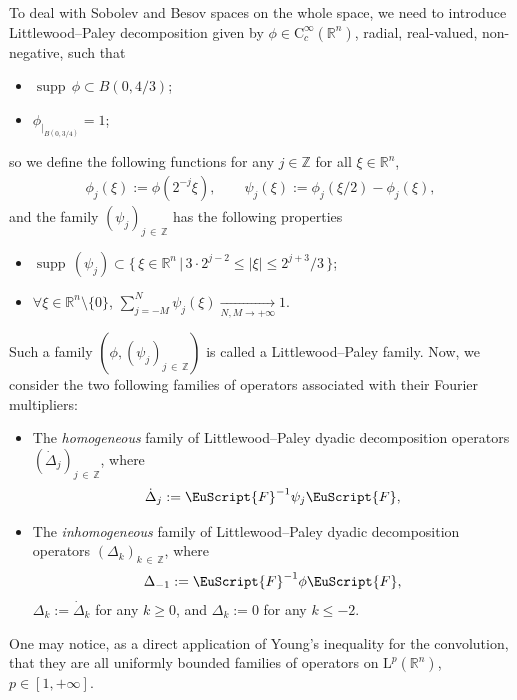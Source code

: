 \documentclass[AHL,Unicode,longabstracts,published]{cedram}
\DeclareMathOperator{\supp}{supp\,}
\newcommand{\bbR}{\mathbb{R}}
\newcommand{\bbZ}{\mathbb{Z}}
\newcommand{\rmL}{\mathrm{L}}
\newcommand{\rmC}{\mathrm{C}}
\newcommand{\eus}{\EuScript}
\let\oldforall\forall
\renewcommand*{\forall}{\mathrel{\oldforall}}
\begin{document}
To deal with Sobolev and Besov spaces on the whole space, we need to introduce Littlewood--Paley decomposition given by $\phi\in \rmC_c^\infty(\bbR^n)$, radial, real-valued, non-negative, such that
\begin{itemize}
\item $\supp \phi \subset B(0,4/3)$;
\item ${\phi}_{|_{B(0,3/4)}}=1$;
\end{itemize}
so we define the following functions for any $j\in\bbZ$ for all $\xi\in\bbR^n$,
\begin{align*}
\phi_j(\xi):=\phi\left(2^{-j}\xi\right),\qquad \psi_j(\xi):= \phi_{j}(\xi/2)-\phi_{j}(\xi),
\end{align*}
and the family $(\psi_j)_{j\,\in\,\bbZ}$ has the following properties
\begin{itemize}
\item $\supp(\psi_j)\subset \{\,\xi\in\bbR^n\,|\,3\cdot 2^{j-2}\leqslant\left|{\xi}\right| \leqslant 2^{j+3}/3\,\}$;
\item $\forall\xi\in\bbR^n\setminus\{0\}$, $\sum_{j=-M}^N{\psi_j}(\xi)\xrightarrow[N,M\rightarrow+\infty]{} 1$.
\end{itemize}
Such a family $(\phi,(\psi_j)_{j\,\in\,\bbZ})$ is called a Littlewood--Paley family. Now, we consider the two following families of operators associated with their Fourier multipliers:
\begin{itemize}
\item The \emph{homogeneous} family of Littlewood--Paley dyadic decomposition operators $(\dot{\Delta}_j)_{j\,\in\,\bbZ}$, where
\begin{align*}
\dot{\Delta}_j:= \eus{F}^{-1}\psi_j\eus{F},
\end{align*}
\item The \emph{inhomogeneous} family of Littlewood--Paley dyadic decomposition operators $({\Delta}_k)_{k\,\in\,\bbZ}$, where
\begin{align*}
{\Delta}_{-1}:= \eus{F}^{-1}\phi\eus{F},
\end{align*}
$\Delta_k:=\dot{\Delta}_k$ for any $k\geqslant 0$, and $\Delta_k:=0$ for any $k\leqslant-2$.
\end{itemize}
One may notice, as a direct application of Young's inequality for the convolution, that they are all uniformly bounded families of operators on $\rmL^p(\bbR^n)$,
$p\in[1,+\infty]$.
\end{document}
